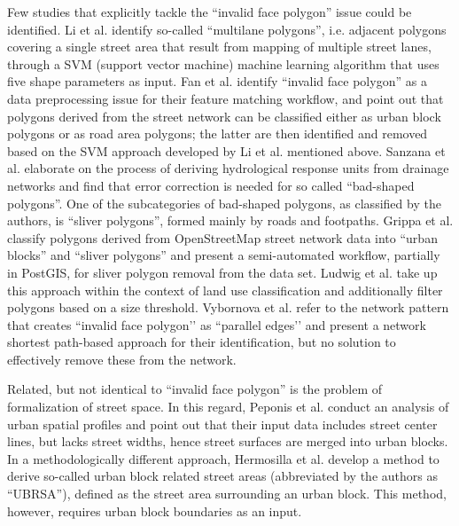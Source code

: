 Few studies that explicitly tackle the ``invalid face polygon'' issue could be identified. Li et al.
\cite{li_polygon-based_2014} identify so-called ``multilane polygons'', i.e. adjacent
polygons covering a single street area that result from mapping of multiple street
lanes, through a SVM (support vector machine) machine learning algorithm that uses five
shape parameters as input. Fan et al. \cite{fan_polygon-based_2016} identify ``invalid face polygon''
as a data preprocessing issue for their feature matching workflow, and point out that
polygons derived from the street network can be classified either as urban block
polygons or as road area polygons; the latter are then identified and removed based on
the SVM approach developed by Li et al. \cite{li_polygon-based_2014} mentioned above.
Sanzana et al. \cite{sanzana_decomposition_2018} elaborate on the process of deriving
hydrological response units from drainage networks and find that error correction is
needed for so called ``bad-shaped polygons''. One of the subcategories of bad-shaped
polygons, as classified by the authors, is ``sliver polygons'', formed mainly by roads
and footpaths. Grippa et al. \cite{grippa_mapping_2018} classify polygons derived from
OpenStreetMap street network data into ``urban blocks'' and ``sliver polygons'' and
present a semi-automated workflow, partially in PostGIS, for sliver polygon removal from
the data set. Ludwig et al. \cite{ludwig_mapping_2021} take up this approach within the
context of land use classification and additionally filter polygons based on a size
threshold. Vybornova et al. \cite{vybornova_automated_2022} refer to the network pattern
that creates ``invalid face polygon’’ as ``parallel edges’’ and present a network shortest path-based
approach for their identification, but no solution to effectively remove these from the
network.

Related, but not identical to ``invalid face polygon'' is the problem of formalization of street
space. In this regard, Peponis et al. \cite{peponis_measuring_2007} conduct an analysis
of urban spatial profiles and point out that their input data includes street center
lines, but lacks street widths, hence street surfaces are merged into urban blocks. In a
methodologically different approach, Hermosilla et al. \cite{hermosilla_using_2014}
develop a method to derive so-called urban block related street areas (abbreviated by
the authors as ``UBRSA''), defined as the street area surrounding an urban block. This
method, however, requires urban block boundaries as an input.

